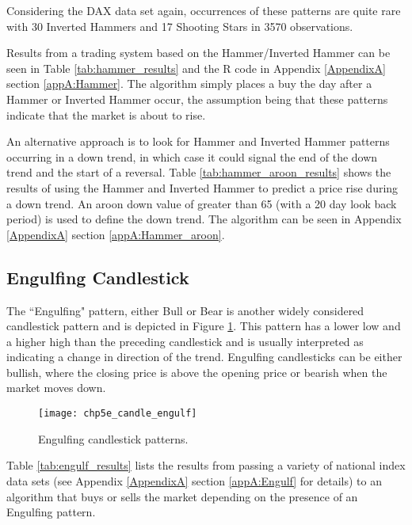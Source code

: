 Considering the DAX data set again, occurrences of these patterns are quite rare with 30 Inverted Hammers and 17 Shooting Stars in 3570 observations.

Results from a trading system based on the Hammer/Inverted Hammer can be seen in Table \ref{tab:hammer_results} and the R code in Appendix \ref{AppendixA} section \ref{appA:Hammer}. The algorithm simply places a buy the day after a Hammer or Inverted Hammer occur, the assumption being that these patterns indicate that the market is about to rise.




An alternative approach is to look for Hammer and Inverted Hammer patterns occurring in a down trend, in which case it could signal the end of the down trend and the start of a reversal. Table \ref{tab:hammer_aroon_results} shows the results of using the Hammer and Inverted Hammer to predict a price rise during a down trend. An aroon down value of greater than 65 (with a 20 day look back period) is used to define the down trend. The algorithm can be seen in Appendix \ref{AppendixA} section \ref{appA:Hammer_aroon}.  




\subsection{Engulfing Candlestick}
\label{sec:eng_cand}
The \textquotedblleft Engulfing" pattern, either Bull or Bear is another widely considered candlestick pattern and is depicted in Figure \ref{fig:chp5e:engulf}. This pattern has a lower low and a higher high than the preceding candlestick and is usually interpreted as indicating a change in direction of the trend. Engulfing candlesticks can be either bullish, where the closing price is above the opening price or bearish when the market moves down.

\begin{figure}[tbph]
\centering
\texttt{[image: chp5e\_candle\_engulf]}
\caption[Engulfing candlestick patterns]{Engulfing candlestick patterns.}
\label{fig:chp5e:engulf}
\end{figure}

Table \ref{tab:engulf_results} lists the results from passing a variety of national index data sets (see Appendix \ref{AppendixA} section \ref{appA:Engulf} for details) to an algorithm that buys or sells the market depending on the presence of an Engulfing pattern.


